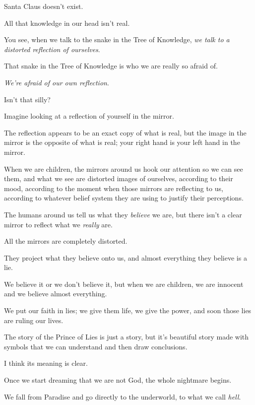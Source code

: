 \documentclass{article}
\numberwithin{equation}{section}
\begin{document}

Santa Claus doesn't exist.

All that knowledge in our head isn't real.

%
You see, when we talk to the snake in the Tree of Knowledge, \textit{we talk to a distorted reflection of ourselves}.

That snake in the Tree of Knowledge is who we are really so afraid of.

\textit{We're afraid of our own reflection}.

Isn't that silly?

Imagine looking at a reflection of yourself in the mirror.

The reflection appears to be an exact copy of what is real, but the image in the mirror is the opposite of what is real; your right hand is your left hand in the mirror.


%
When we are children, the mirrors around us hook our attention so we can see them, and what we see are distorted images of ourselves, according to their mood, according to the moment when those mirrors are reflecting to us, according to whatever belief system they are using to justify their perceptions.

The humans around us tell us what they \textit{believe} we are, but there isn't a clear mirror to reflect what we \textit{really} are.

All the mirrors are completely distorted.

They project what they believe onto us, and almost everything they believe is a lie.

We believe it or we don't believe it, but when we are children, we are innocent and we believe almost everything.

We put our faith in lies; we give them life, we give the power, and soon those lies are ruling our lives.

The story of the Prince of Lies is just a story, but it's beautiful story made with symbols that we can understand and then draw conclusions.

I think its meaning is clear.

Once we start dreaming that we are not God, the whole nightmare begins.

We fall from Paradise and go directly to the underworld, to what we call \textit{hell}.
\end{document}
